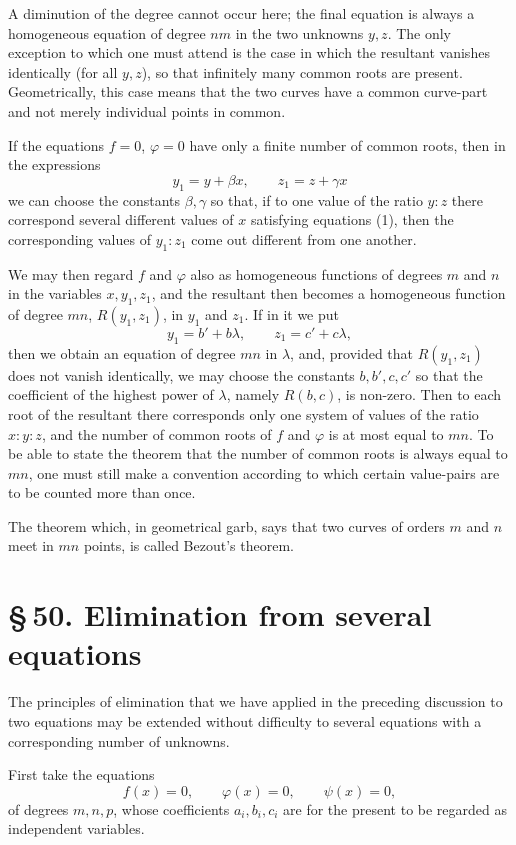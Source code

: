 \documentclass[11pt]{article}
\providecommand{\sect}[2]{\section*{\S\,#1. #2}}
\begin{document}
A diminution of the degree cannot occur here; the final equation is always a homogeneous equation of degree $nm$ in the two unknowns $y,z$. The only exception to which one must attend is the case in which the resultant vanishes identically (for all $y,z$), so that infinitely many common roots are present. Geometrically, this case means that the two curves have a common curve-part and not merely individual points in common.

If the equations $f=0$, $\varphi=0$ have only a finite number of common roots, then in the expressions
\[
y_1=y+\beta x,
\qquad
z_1=z+\gamma x
\]
we can choose the constants $\beta,\gamma$ so that, if to one value of the ratio $y:z$ there correspond several different values of $x$ satisfying equations (1), then the corresponding values of $y_1:z_1$ come out different from one another.

We may then regard $f$ and $\varphi$ also as homogeneous functions of degrees $m$ and $n$ in the variables $x,y_1,z_1$, and the resultant then becomes a homogeneous function of degree $mn$, $R(y_1,z_1)$, in $y_1$ and $z_1$. If in it we put
\[
y_1=b'+b\lambda,
\qquad
z_1=c'+c\lambda,
\]
then we obtain an equation of degree $mn$ in $\lambda$, and, provided that $R(y_1,z_1)$ does not vanish identically, we may choose the constants $b,b',c,c'$ so that the coefficient of the highest power of $\lambda$, namely $R(b,c)$, is non-zero. Then to each root of the resultant there corresponds only one system of values of the ratio $x:y:z$, and the number of common roots of $f$ and $\varphi$ is at most equal to $mn$. To be able to state the theorem that the number of common roots is always equal to $mn$, one must still make a convention according to which certain value-pairs are to be counted more than once.

The theorem which, in geometrical garb, says that two curves of orders $m$ and $n$ meet in $mn$ points, is called Bezout's theorem.

\sect{50}{Elimination from several equations}

The principles of elimination that we have applied in the preceding discussion to two equations may be extended without difficulty to several equations with a corresponding number of unknowns.

First take the equations
\begin{equation}
f(x)=0,
\qquad
\varphi(x)=0,
\qquad
\psi(x)=0,
\tag{1}
\end{equation}
of degrees $m,n,p$, whose coefficients $a_i,b_i,c_i$ are for the present to be regarded as independent variables.
\end{document}

